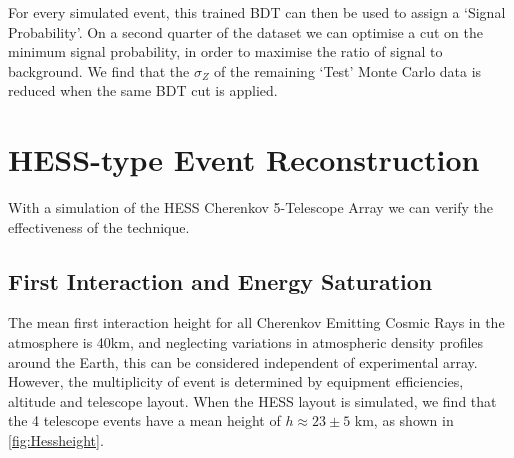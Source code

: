 \documentclass{article}
\begin{document}
For every simulated event, this trained BDT can then be used to assign a \textquoteleft Signal Probability'. On a second quarter of the dataset we can optimise a cut on the minimum signal probability, in order to maximise the ratio of signal to background. We find that the $\sigma_{Z}$ of the remaining \textquoteleft Test' Monte Carlo data is reduced when the same BDT cut is applied.

\section{HESS-type Event Reconstruction}
With a simulation of the HESS Cherenkov 5-Telescope Array we can verify the effectiveness of the technique. 
\subsection{First Interaction and Energy Saturation}
The mean first interaction height for all Cherenkov Emitting Cosmic Rays in the atmosphere is 40km, and neglecting variations in atmospheric density profiles around the Earth, this can be considered independent of experimental array. However, the multiplicity of event is determined by equipment efficiencies, altitude and telescope layout. When the HESS layout is simulated, we find that the 4 telescope events have a mean height of $h \approx 23 \pm 5$ km, as shown in \ref{fig:Hessheight}.
\end{document}
